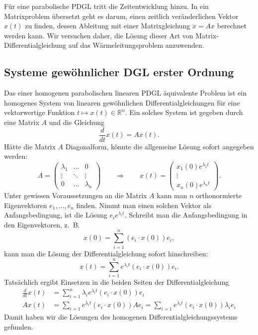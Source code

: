 Für eine parabolische PDGL tritt die Zeitentwicklung hinzu. In
ein Matrixproblem übersetzt geht es darum, einen zeitlich
veränderlichen Vektor $x(t)$ zu finden, dessen Ableitung mit einer
Matrixgleichung $\dot x=Ax$ berechnet werden kann. Wir versuchen daher,
die Lösung dieser Art von Matrix-Differentialgleichung auf das
Wärmeleitungsproblem anzuwenden.

\subsection{Systeme gewöhnlicher DGL erster Ordnung}
Das einer homogenen parabolischen linearen PDGL äquivalente Problem
ist ein homogenes System
von linearen gewöhnlichen Differentialgleichungen für eine vektorwertige Funktion
$t\mapsto x(t)\in\mathbb R^n$.
Ein solches System ist gegeben durch eine Matrix $A$ und die Gleichung
\[
\frac{d}{dt}x(t)=Ax(t).
\]
Hätte die Matrix $A$ Diagonalform, könnte die allgemeine Lösung 
sofort angegeben werden:
\[
A=\begin{pmatrix}
\lambda_1&\dots&0\\
\vdots&\ddots&\vdots\\
0&\dots&\lambda_n
\end{pmatrix}
\qquad\Rightarrow\qquad
x(t)=\begin{pmatrix}
x_1(0)e^{\lambda_1t}
\\
\vdots
\\
x_n(0)e^{\lambda_nt}
\end{pmatrix}.
\]
Unter gewissen Voraussetzungen an die Matrix $A$ kann man $n$
orthonormierte Eigenvektoren
$e_1,\dots,e_n$ finden. Nimmt man einen solchen Vektor als
Anfangsbedingung, ist die Lösung $e_ie^{\lambda_it}$. Schreibt man die
Anfangsbedingung in den Eigenvektoren, z.~B.
\[
x(0)=\sum_{i=1}^n(e_i \cdot x(0))e_i,
\]
kann man die Lösung der Differentialgleichung sofort hinschreiben:
\begin{equation}
x(t)=\sum_{i=1}^n
e^{\lambda_i t}
(e_i\cdot x(0))e_i
.
\label{development}
\end{equation}
Tatsächlich ergibt Einsetzen in die beiden Seiten der Differentialgleichung
\begin{align*}
\frac{d}{dt}x(t)&=\sum_{i=1}^n\lambda_ie^{\lambda_i t}(e_i\cdot x(0))e_i
\\
Ax(t)
&=\sum_{i=1}e^{\lambda_it}(e_i\cdot x(0))Ae_i
=\sum_{i=1}e^{\lambda_it}(e_i\cdot x(0))\lambda_i e_i
\end{align*}
Damit haben wir die Lösungen des homogenen Differentialgleichungssystems
gefunden.

